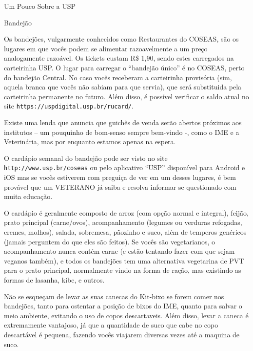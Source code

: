 \begin{secao}{Um Pouco Sobre a USP}
\begin{subsecao}{Bandejão}


Os bandejões, vulgarmente conhecidos como Restaurantes do COSEAS, são os lugares
em que vocês podem se alimentar razoavelmente a um preço analogamente razoável.
Os tickets custam R\$ 1,90, sendo estes carregados na carteirinha USP. O
lugar para carregar o ``bandejão único'' é no COSEAS, perto do bandejão
Central. No caso vocês receberam a carteirinha provisória (sim, aquela
branca que vocês não sabiam para que servia), que será substituida pela carteirinha
permanente no futuro. Além disso, é possível verificar o saldo atual no
site {\tt https://uspdigital.usp.br/rucard/}.

Existe uma lenda que anuncia que guichês de venda serão abertos próximos aos
institutos – um pouquinho de bom-senso sempre bem-vindo -, como o IME e
a Veterinária, mas por enquanto estamos apenas na espera.

O cardápio semanal do bandejão pode ser visto no site {\tt http://www.usp.br/coseas}
ou pelo aplicativo ``USP'' disponível para Android e iOS mas se vocês estiverem
com preguiça de ver em um desses lugares, é bem provável que um VETERANO já saiba
e resolva informar se questionado com muita educação.

O cardápio é geralmente composto de arroz (com opção normal e integral), feijão,
prato principal (carne/ovos), acompanhamento (legumes ou verduras refogadas,
cremes, molhos), salada, sobremesa, pãozinho e suco, além de temperos genéricos
(jamais perguntem do que eles são feitos). Se vocês são vegetarianos, o
acompanhamento nunca contém carne (e estão tentando fazer com que sejam veganos
também), e todos os bandejões tem uma alternativa vegetarina de PVT para o
prato principal, normalmente vindo na forma de ração, mas existindo as formas
de lasanha, kibe, e outros.


Não se esqueçam de levar as suas canecas do Kit-bixo se forem comer nos bandejões,
tanto para ostentar a posição de bixos do IME, quanto para salvar o meio ambiente,
evitando o uso de copos descartaveis. Além disso, levar a caneca é extremamente
vantajoso, já que a quantidade de suco que cabe no copo descartável é pequena,
fazendo vocês viajarem diversas vezes até a maquina de suco.



\end{subsecao}
\end{secao}

